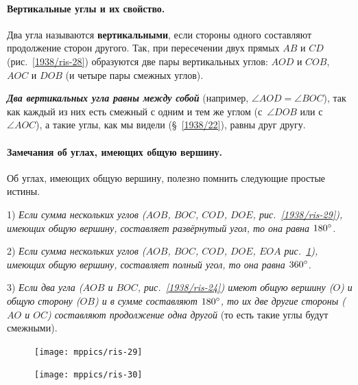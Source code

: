 \documentclass[twoside]{book}
\makeatletter
\newcommand{\rindex}[2][\imki@jobname]{%
  \index[#1]{\detokenize{#2}}%
}
\makeatother
\begin{document}
\paragraph{Вертикальные углы и их свойство.}\label{1938/26}
Два угла называются \rindex{вертикальные углы}\textbf{вертикальными}, если стороны одного составляют продолжение сторон другого.
Так, при пересечении двух прямых $AB$ и $CD$ (рис.~\ref{1938/ris-28}) образуются две пары вертикальных углов:
$AOD$ и $COB$, $AOC$ и $DOB$ (и четыре пары смежных углов).

\textbf{\emph{Два вертикальных угла равны между собой}} (например, $\angle AOD = \angle BOC$), так как каждый из них есть смежный с одним и тем же углом (с~$\angle DOB$ или с~$\angle AOC$), а такие углы, как мы видели (§~\ref{1938/22}), равны друг другу.

\paragraph{Замечания об углах, имеющих общую вершину.}\label{1938/27}
Об углах, имеющих общую вершину, полезно помнить следующие простые истины.

1) \emph{Если сумма нескольких углов ($AOB$, $BOC$, $COD$, $DOE$, рис.~\ref{1938/ris-29}), имеющих общую вершину, составляет развёрнутый угол, то она равна $180\degree$.}

2) \emph{Если сумма нескольких углов ($AOB$, $BOC$, $COD$, $DOE$, $EOA$ рис.~\ref{1938/ris-30}), имеющих общую вершину, составляет полный угол, то она равна  $360\degree$.}

3) \emph{Если два угла ($AOB$ и $BOC$, рис.~\ref{1938/ris-24}) имеют общую вершину ($O$) и общую сторону ($OB$) и в сумме составляют $180\degree$, то их две другие стороны ($AO$ и $OC$) составляют продолжение одна другой} (то есть такие углы будут смежными).

\begin{figure}[h]
\begin{minipage}{.48\textwidth}
\centering
\texttt{[image: mppics/ris-29]}
\end{minipage}\hfill
\begin{minipage}{.48\textwidth}
\centering
\texttt{[image: mppics/ris-30]}
\end{minipage}

\medskip

\begin{minipage}{.48\textwidth}
\centering
\caption{}\label{1938/ris-29}
\end{minipage}\hfill
\begin{minipage}{.48\textwidth}
\centering
\caption{}\label{1938/ris-30}
\end{minipage}
\vskip-4mm
\end{figure}
\end{document}
